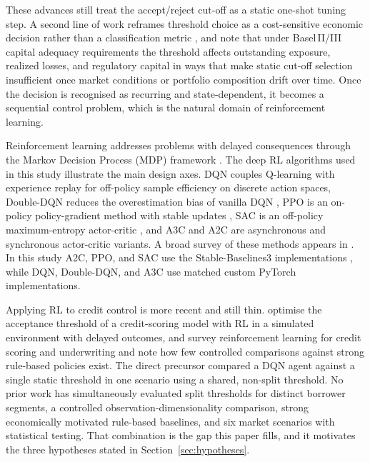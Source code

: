 \documentclass[preprint,review,authoryear,12pt]{elsarticle}
\begin{document}
These advances still treat the accept/reject cut-off as a static one-shot tuning step.
A second line of work reframes threshold choice as a cost-sensitive economic decision
rather than a classification metric \citep{baesens2003}, and \citet{bellotti2009} note
that under Basel\,II/III capital adequacy requirements the threshold affects outstanding
exposure, realized losses, and regulatory capital in ways that make static cut-off
selection insufficient once market conditions or portfolio composition drift over time.
Once the decision is recognised as recurring and state-dependent, it becomes a
sequential control problem, which is the natural domain of reinforcement learning.

Reinforcement learning addresses problems with delayed consequences through the Markov
Decision Process (MDP) framework \citep{dayan2008, arulkumaran2017}. The deep RL
algorithms used in this study illustrate the main design axes. DQN couples Q-learning
with experience replay for off-policy sample efficiency on discrete action spaces,
Double-DQN reduces the overestimation bias of vanilla DQN \citep{van2016ddqn}, PPO is an
on-policy policy-gradient method with stable updates \citep{schulman2017ppo}, SAC is an
off-policy maximum-entropy actor-critic \citep{haarnoja2018sac}, and A3C and A2C are
asynchronous and synchronous actor-critic variants. A broad survey of these methods
appears in \citet{arulkumaran2017}. In this study A2C, PPO, and SAC use the
Stable-Baselines3 implementations \citep{stable_baselines3}, while DQN, Double-DQN, and
A3C use matched custom PyTorch implementations.

Applying RL to credit control is more recent and still thin. \citet{herasymovych2019}
optimise the acceptance threshold of a credit-scoring model with RL in a simulated
environment with delayed outcomes, and \citet{kiatsupaibul2024} survey reinforcement
learning for credit scoring and underwriting and note how few controlled comparisons
against strong rule-based policies exist. The direct precursor \citep{herasymovych2019}
compared a DQN agent against a single static threshold in one scenario using a shared,
non-split threshold. No prior work has simultaneously evaluated split thresholds for
distinct borrower segments, a controlled observation-dimensionality comparison, strong
economically motivated rule-based baselines, and six market scenarios with statistical
testing. That combination is the gap this paper fills, and it motivates the three
hypotheses stated in Section~\ref{sec:hypotheses}.
\end{document}
